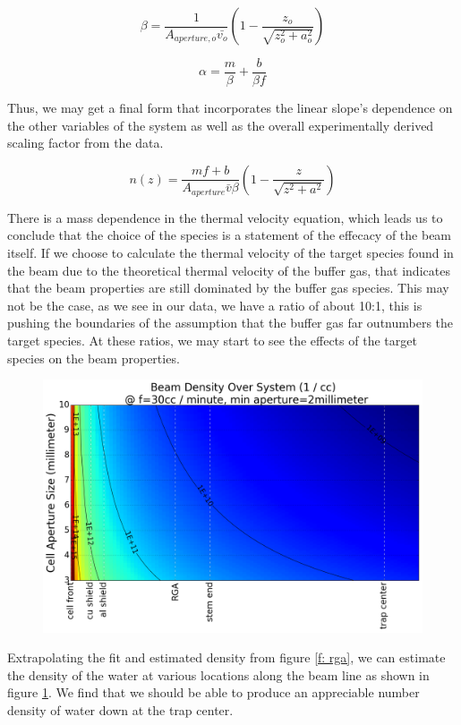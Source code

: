 $$\beta = \frac{1}{A_{aperture, o} \bar{v_o}}\left(1-\frac{z_o}{\sqrt{z_o^2+a_o^2}}\right)$$

$$\alpha=\frac{m}{\beta}+\frac{b}{\beta f}$$

Thus, we may get a final form that incorporates the linear slope's dependence on the other variables of the system as well as the overall experimentally derived scaling factor from the data.

$$n(z)=\frac{mf+b}{A_{aperture} \bar{v} \beta}\left(1-\frac{z}{\sqrt{z^2+a^2}}\right)$$

There is a mass dependence in the thermal velocity equation, which leads us to conclude that the choice of the species is a statement of the effecacy of the beam itself. If we choose to calculate the thermal velocity of the target species found in the beam due to the theoretical thermal velocity of the buffer gas, that indicates that the beam properties are still dominated by the buffer gas species. This may not be the case, as we see in our data, we have a ratio of about 10:1, this is pushing the boundaries of the assumption that the buffer gas far outnumbers the target species. At these ratios, we may start to see the effects of the target species on the beam properties.

\begin{figure}[H]
\centering
\includegraphics[width=1\textwidth]{images/CBGB_beam_density_over_system.png}
\caption{}
\label{f: beam_density}
\end{figure}

Extrapolating the fit and estimated density from figure \ref{f: rga}, we can estimate the density of the water at various locations along the beam line as shown in figure \ref{f: beam_density}. We find that we should be able to produce an appreciable number density of water down at the trap center.

